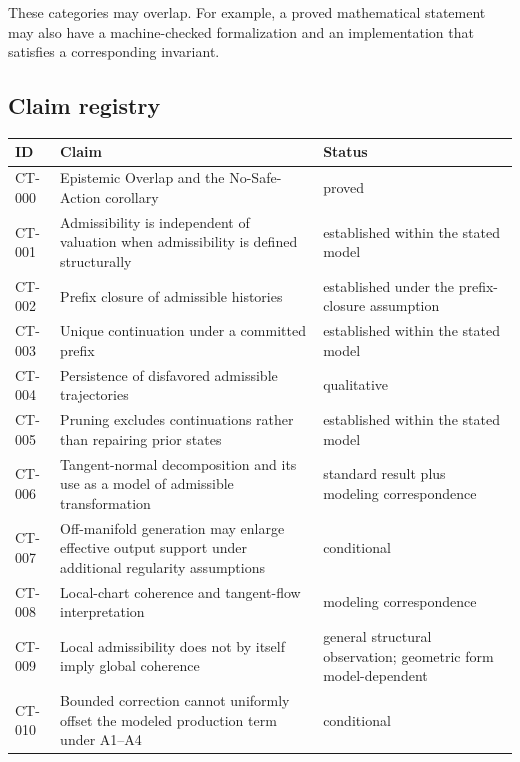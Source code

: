 \documentclass[11pt]{article}
\theoremstyle{definition}
\theoremstyle{remark}
\begin{document}
These categories may overlap. For example, a proved mathematical statement
may also have a machine-checked formalization and an implementation that
satisfies a corresponding invariant.

\subsection{Claim registry}

\begin{center}
\small
\begin{tabular}{@{}p{1.4cm}p{7.3cm}p{4.7cm}@{}}
\toprule
ID & Claim & Status \\
\midrule
CT-000 &
Epistemic Overlap and the No-Safe-Action corollary &
proved \\

CT-001 &
Admissibility is independent of valuation when admissibility is defined
structurally &
established within the stated model \\

CT-002 &
Prefix closure of admissible histories &
established under the prefix-closure assumption \\

CT-003 &
Unique continuation under a committed prefix &
established within the stated model \\

CT-004 &
Persistence of disfavored admissible trajectories &
qualitative \\

CT-005 &
Pruning excludes continuations rather than repairing prior states &
established within the stated model \\

CT-006 &
Tangent-normal decomposition and its use as a model of admissible
transformation &
standard result plus modeling correspondence \\

CT-007 &
Off-manifold generation may enlarge effective output support under additional
regularity assumptions &
conditional \\

CT-008 &
Local-chart coherence and tangent-flow interpretation &
modeling correspondence \\

CT-009 &
Local admissibility does not by itself imply global coherence &
general structural observation; geometric form model-dependent \\

CT-010 &
Bounded correction cannot uniformly offset the modeled production term under
A1--A4 &
conditional \\


\end{tabular}
\end{center}
\end{document}
